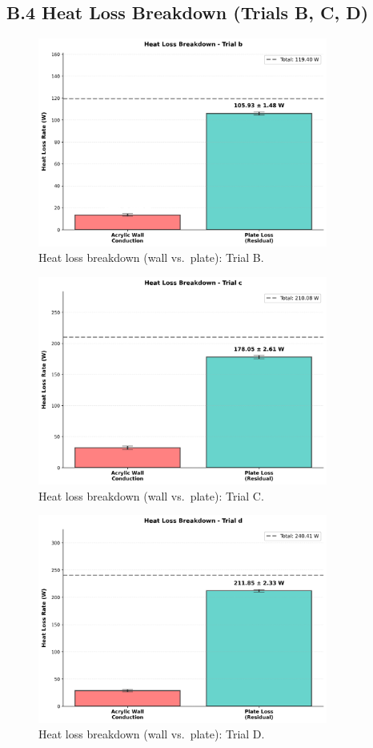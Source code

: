 \documentclass[12pt]{article}
\begin{document}
\subsection*{B.4 Heat Loss Breakdown (Trials B, C, D)}

\begin{figure}[H]
\centering
\includegraphics[width=0.85\textwidth]{graphs/part2_trial_b_loss_breakdown.png}
\caption{Heat loss breakdown (wall vs.\ plate): Trial B.}
\end{figure}

\begin{figure}[H]
\centering
\includegraphics[width=0.85\textwidth]{graphs/part2_trial_c_loss_breakdown.png}
\caption{Heat loss breakdown (wall vs.\ plate): Trial C.}
\end{figure}

\begin{figure}[H]
\centering
\includegraphics[width=0.85\textwidth]{graphs/part2_trial_d_loss_breakdown.png}
\caption{Heat loss breakdown (wall vs.\ plate): Trial D.}
\end{figure}
\end{document}
